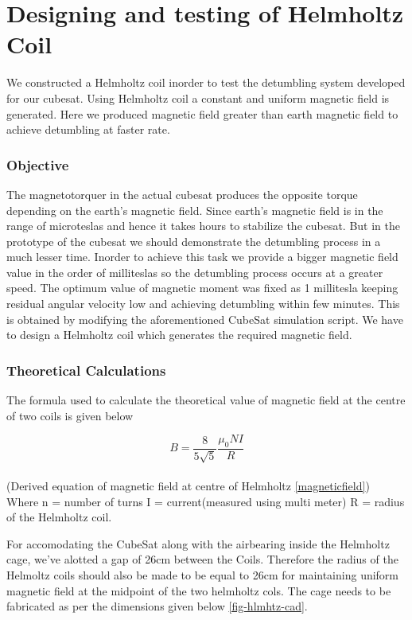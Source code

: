 \chapter{Designing and testing of Helmholtz Coil}


We constructed a Helmholtz coil inorder to test the detumbling system developed for our cubesat. Using Helmholtz coil a constant and uniform magnetic field is generated. Here we produced magnetic field greater than earth magnetic field to achieve detumbling at faster rate.

\subsection{Objective}

The magnetotorquer in the actual cubesat produces the opposite torque depending on the earth's magnetic field. Since earth's magnetic field is in the range of microteslas and hence it takes hours to stabilize the cubesat. But in the prototype of the cubesat we should demonstrate the detumbling process in a much lesser time. Inorder to achieve this task we provide a bigger magnetic field value in the order of milliteslas so the detumbling process occurs at a greater speed. The optimum value of magnetic moment was fixed as 1 millitesla keeping residual angular velocity low and achieving detumbling within few minutes. This is obtained by modifying the aforementioned CubeSat simulation script. We have to design a Helmholtz coil which generates the required magnetic field.

\subsection{Theoretical Calculations}
\par The formula used to calculate the theoretical value of magnetic field at the centre of two coils is given below

$$ B= \frac{8}{5\sqrt{5}}\frac{\mu_0 NI}{R}$$\\
\hspace{100pt} (Derived equation of magnetic field at centre of Helmholtz \ref{magneticfield})\\

Where n = number of turns
            I = current(measured using multi meter)
            R = radius of the Helmholtz coil.
\vspace{10pt}  

For accomodating the CubeSat along with the airbearing inside the Helmholtz cage, we've alotted a gap of 26cm between the Coils. Therefore the radius of the Helmoltz coils should also be made to be equal to 26cm for maintaining uniform magnetic field at the midpoint of the two helmholtz cols. The cage needs to be fabricated as per the dimensions given below \ref{fig-hlmhtz-cad}.

